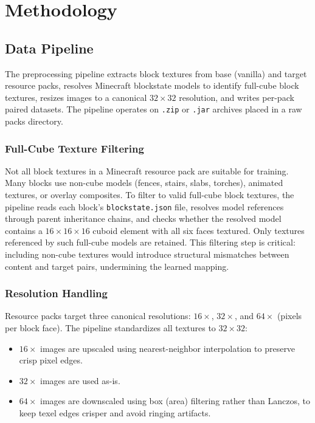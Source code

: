 \chapter{Methodology}
\label{chap:method}

\section{Data Pipeline}

The preprocessing pipeline extracts block textures from base (vanilla) and target resource packs, resolves Minecraft blockstate models to identify full-cube block textures, resizes images to a canonical $32 \times 32$ resolution, and writes per-pack paired datasets. The pipeline operates on \texttt{.zip} or \texttt{.jar} archives placed in a raw packs directory.


\subsection{Full-Cube Texture Filtering}

Not all block textures in a Minecraft resource pack are suitable for training. Many blocks use non-cube models (fences, stairs, slabs, torches), animated textures, or overlay composites. To filter to valid full-cube block textures, the pipeline reads each block's \texttt{blockstate.json} file, resolves model references through parent inheritance chains, and checks whether the resolved model contains a $16 \times 16 \times 16$ cuboid element with all six faces textured. Only textures referenced by such full-cube models are retained. This filtering step is critical: including non-cube textures would introduce structural mismatches between content and target pairs, undermining the learned mapping.

\subsection{Resolution Handling}

Resource packs target three canonical resolutions: $16\times$, $32\times$, and $64\times$ (pixels per block face). The pipeline standardizes all textures to $32\times32$:
\begin{itemize}
    \item $16\times$ images are upscaled using nearest-neighbor interpolation to preserve crisp pixel edges.
    \item $32\times$ images are used as-is.
    \item $64\times$ images are downscaled using box (area) filtering rather than Lanczos, to keep texel edges crisper and avoid ringing artifacts.
\end{itemize}

